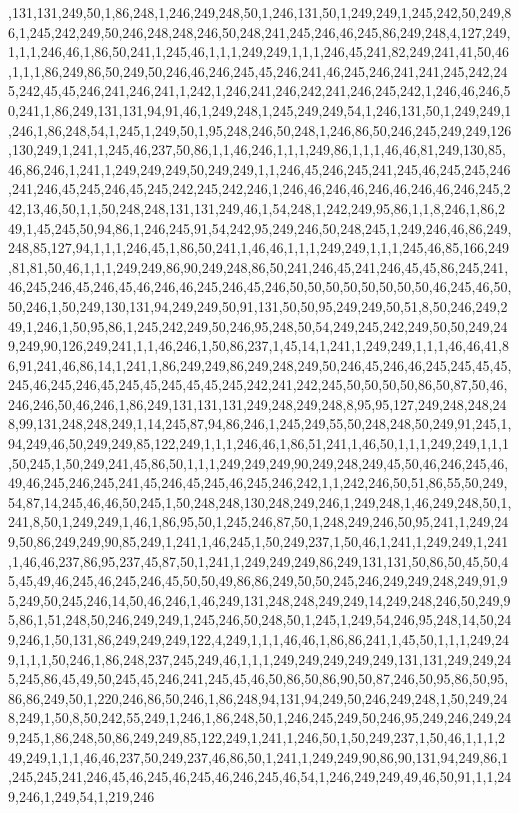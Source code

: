 ,131,131,249,50,1,86,248,1,246,249,248,50,1,246,131,50,1,249,249,1,245,242,50,249,86,1,245,242,249,50,246,248,248,246,50,248,241,245,246,46,245,86,249,248,4,127,249,1,1,1,246,46,1,86,50,241,1,245,46,1,1,1,249,249,1,1,1,246,45,241,82,249,241,41,50,46,1,1,1,86,249,86,50,249,50,246,46,246,245,45,246,241,46,245,246,241,241,245,242,245,242,45,45,246,241,246,241,1,242,1,246,241,246,242,241,246,245,242,1,246,46,246,50,241,1,86,249,131,131,94,91,46,1,249,248,1,245,249,249,54,1,246,131,50,1,249,249,1,246,1,86,248,54,1,245,1,249,50,1,95,248,246,50,248,1,246,86,50,246,245,249,249,126,130,249,1,241,1,245,46,237,50,86,1,1,46,246,1,1,1,249,86,1,1,1,46,46,81,249,130,85,46,86,246,1,241,1,249,249,249,50,249,249,1,1,246,45,246,245,241,245,46,245,245,246,241,246,45,245,246,45,245,242,245,242,246,1,246,46,246,46,246,46,246,46,246,245,242,13,46,50,1,1,50,248,248,131,131,249,46,1,54,248,1,242,249,95,86,1,1,8,246,1,86,249,1,45,245,50,94,86,1,246,245,91,54,242,95,249,246,50,248,245,1,249,246,46,86,249,248,85,127,94,1,1,1,246,45,1,86,50,241,1,46,46,1,1,1,249,249,1,1,1,245,46,85,166,249,81,81,50,46,1,1,1,249,249,86,90,249,248,86,50,241,246,45,241,246,45,45,86,245,241,46,245,246,45,246,45,46,246,46,245,246,45,246,50,50,50,50,50,50,50,50,46,245,46,50,50,246,1,50,249,130,131,94,249,249,50,91,131,50,50,95,249,249,50,51,8,50,246,249,249,1,246,1,50,95,86,1,245,242,249,50,246,95,248,50,54,249,245,242,249,50,50,249,249,249,90,126,249,241,1,1,46,246,1,50,86,237,1,45,14,1,241,1,249,249,1,1,1,46,46,41,86,91,241,46,86,14,1,241,1,86,249,249,86,249,248,249,50,246,45,246,46,245,245,45,45,245,46,245,246,45,245,45,245,45,45,245,242,241,242,245,50,50,50,50,86,50,87,50,46,246,246,50,46,246,1,86,249,131,131,131,249,248,249,248,8,95,95,127,249,248,248,248,99,131,248,248,249,1,14,245,87,94,86,246,1,245,249,55,50,248,248,50,249,91,245,1,94,249,46,50,249,249,85,122,249,1,1,1,246,46,1,86,51,241,1,46,50,1,1,1,249,249,1,1,1,50,245,1,50,249,241,45,86,50,1,1,1,249,249,249,90,249,248,249,45,50,46,246,245,46,49,46,245,246,245,241,45,246,45,245,46,245,246,242,1,1,242,246,50,51,86,55,50,249,54,87,14,245,46,46,50,245,1,50,248,248,130,248,249,246,1,249,248,1,46,249,248,50,1,241,8,50,1,249,249,1,46,1,86,95,50,1,245,246,87,50,1,248,249,246,50,95,241,1,249,249,50,86,249,249,90,85,249,1,241,1,46,245,1,50,249,237,1,50,46,1,241,1,249,249,1,241,1,46,46,237,86,95,237,45,87,50,1,241,1,249,249,249,86,249,131,131,50,86,50,45,50,45,45,49,46,245,46,245,246,45,50,50,49,86,86,249,50,50,245,246,249,249,248,249,91,95,249,50,245,246,14,50,46,246,1,46,249,131,248,248,249,249,14,249,248,246,50,249,95,86,1,51,248,50,246,249,249,1,245,246,50,248,50,1,245,1,249,54,246,95,248,14,50,249,246,1,50,131,86,249,249,249,122,4,249,1,1,1,46,46,1,86,86,241,1,45,50,1,1,1,249,249,1,1,1,50,246,1,86,248,237,245,249,46,1,1,1,249,249,249,249,249,131,131,249,249,245,245,86,45,49,50,245,45,246,241,245,45,46,50,86,50,86,90,50,87,246,50,95,86,50,95,86,86,249,50,1,220,246,86,50,246,1,86,248,94,131,94,249,50,246,249,248,1,50,249,248,249,1,50,8,50,242,55,249,1,246,1,86,248,50,1,246,245,249,50,246,95,249,246,249,249,245,1,86,248,50,86,249,249,85,122,249,1,241,1,246,50,1,50,249,237,1,50,46,1,1,1,249,249,1,1,1,46,46,237,50,249,237,46,86,50,1,241,1,249,249,90,86,90,131,94,249,86,1,245,245,241,246,45,46,245,46,245,46,246,245,46,54,1,246,249,249,49,46,50,91,1,1,249,246,1,249,54,1,219,246